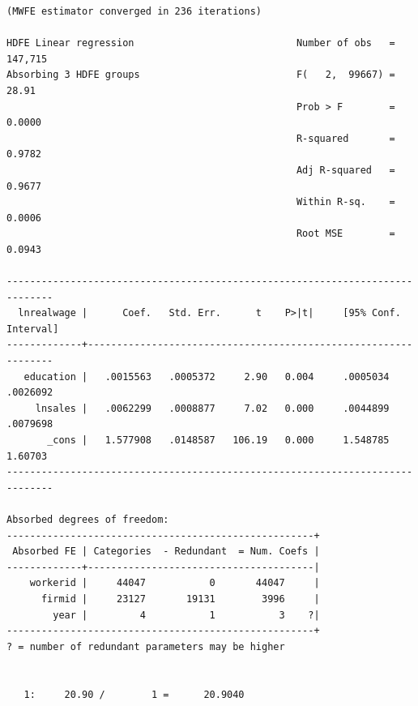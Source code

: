 \documentclass[
  12pt,
]{article}
\newenvironment{Shaded}{\begin{snugshade}}{\end{snugshade}}
\newcommand{\FunctionTok}[1]{\textcolor[rgb]{0.00,0.00,0.00}{#1}}
\newcommand{\NormalTok}[1]{#1}
\newcommand{\OtherTok}[1]{\textcolor[rgb]{0.56,0.35,0.01}{#1}}
\newcommand{\SpecialCharTok}[1]{\textcolor[rgb]{0.00,0.00,0.00}{#1}}
\newcommand{\StringTok}[1]{\textcolor[rgb]{0.31,0.60,0.02}{#1}}
\begin{document}
\begin{verbatim}
(MWFE estimator converged in 236 iterations)

HDFE Linear regression                            Number of obs   =    147,715
Absorbing 3 HDFE groups                           F(   2,  99667) =      28.91
                                                  Prob > F        =     0.0000
                                                  R-squared       =     0.9782
                                                  Adj R-squared   =     0.9677
                                                  Within R-sq.    =     0.0006
                                                  Root MSE        =     0.0943

------------------------------------------------------------------------------
  lnrealwage |      Coef.   Std. Err.      t    P>|t|     [95% Conf. Interval]
-------------+----------------------------------------------------------------
   education |   .0015563   .0005372     2.90   0.004     .0005034    .0026092
     lnsales |   .0062299   .0008877     7.02   0.000     .0044899    .0079698
       _cons |   1.577908   .0148587   106.19   0.000     1.548785     1.60703
------------------------------------------------------------------------------

Absorbed degrees of freedom:
-----------------------------------------------------+
 Absorbed FE | Categories  - Redundant  = Num. Coefs |
-------------+---------------------------------------|
    workerid |     44047           0       44047     |
      firmid |     23127       19131        3996     |
        year |         4           1           3    ?|
-----------------------------------------------------+
? = number of redundant parameters may be higher


   1:     20.90 /        1 =      20.9040
\end{verbatim}

\begin{Shaded}
\end{Shaded}
\end{document}
